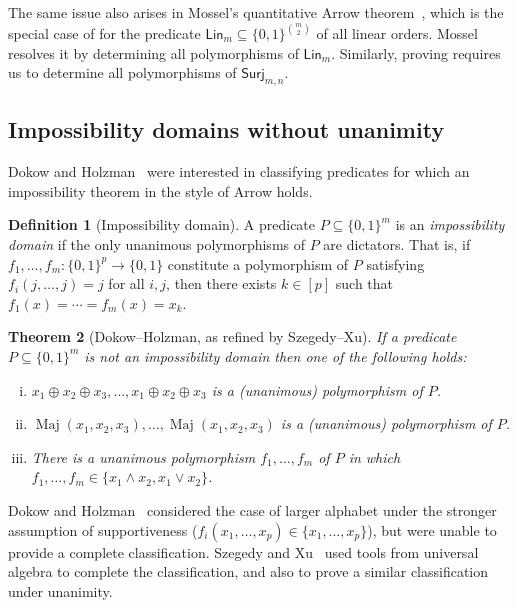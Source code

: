 \documentclass{article}
\providecommand{\Surj}{\mathsf{Surj}}
\providecommand{\Lin}{\mathsf{Lin}}
\DeclareMathOperator{\Maj}{Maj}
\newtheorem{theorem}{Theorem}[section]
\theoremstyle{definition}
\newtheorem{definition}[theorem]{Definition}
\theoremstyle{remark}
\begin{document}
The same issue also arises in Mossel's quantitative Arrow theorem~\cite{Mossel12}, which is the special case of  for the predicate $\Lin_m \subseteq \{0,1\}^{\binom{m}{2}}$ of all linear orders. Mossel~\cite{Mossel09} resolves it by determining all polymorphisms of $\Lin_m$. Similarly, proving  requires us to determine all polymorphisms of $\Surj_{m,n}$.

\subsection{Impossibility domains without unanimity}
\label{sec:intro-impossibility}

Dokow and Holzman~\cite{DokowHolzman09,DokowHolzman10binary} were interested in classifying predicates for which an impossibility theorem in the style of Arrow holds.

\begin{definition}[Impossibility domain]
\label{def:impossibility}
A predicate $P \subseteq \{0,1\}^m$ is an \emph{impossibility domain} if the only unanimous polymorphisms of $P$ are dictators. That is, if $f_1,\dots,f_m\colon \{0,1\}^p \to \{0,1\}$ constitute a polymorphism of $P$ satisfying $f_i(j,\dots,j) = j$ for all $i,j$, then there exists $k \in [p]$ such that $f_1(x) = \cdots = f_m(x) = x_k$.
\end{definition}

\begin{theorem}[Dokow--Holzman, as refined by Szegedy--Xu]
\label{thm:dokow-holzman}
If a predicate $P \subseteq \{0,1\}^m$ is not an impossibility domain then one of the following holds:
\begin{enumerate}[(i)]
\item $x_1 \oplus x_2 \oplus x_3, \dots, x_1 \oplus x_2 \oplus x_3$ is a (unanimous) polymorphism of $P$.
\item $\Maj(x_1,x_2,x_3), \dots, \Maj(x_1,x_2,x_3)$ is a (unanimous) polymorphism of $P$.
\item There is a unanimous polymorphism $f_1,\dots,f_m$ of $P$ in which $f_1,\dots,f_m \in \{x_1 \land x_2, x_1 \lor x_2\}$.
\end{enumerate}
\end{theorem}

Dokow and Holzman~\cite{DokowHolzman10} considered the case of larger alphabet under the stronger assumption of supportiveness ($f_i(x_1,\dots,x_p) \in \{x_1,\dots,x_p\}$), but were unable to provide a complete classification. Szegedy and Xu~\cite{SzegedyXu15} used tools from universal algebra to complete the classification, and also to prove a similar classification under unanimity.
\end{document}
